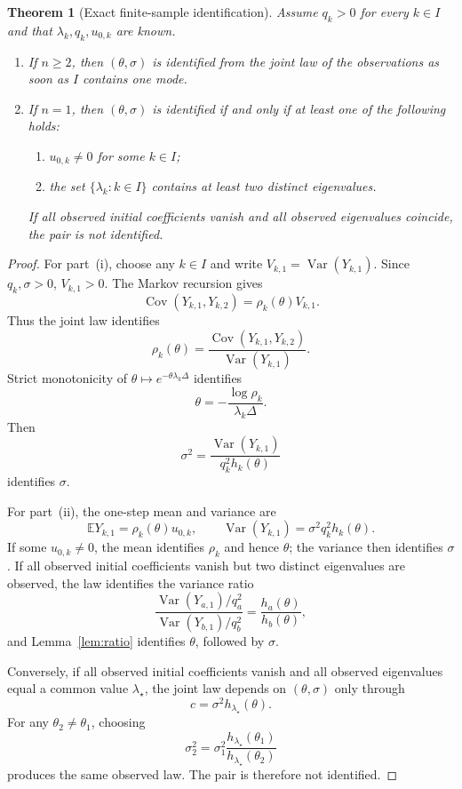 \documentclass[11pt]{article}
\newtheorem{theorem}[assumption]{Theorem}
\theoremstyle{remark}
\newcommand{\E}{\mathbb E}
\newcommand{\Cov}{\operatorname{Cov}}
\newcommand{\Var}{\operatorname{Var}}
\newcommand{\1}{\mathbf 1}
\begin{document}
\begin{theorem}[Exact finite-sample identification]\label{thm:exact-id}
Assume $q_k>0$ for every $k\in I$ and that $\lambda_k,q_k,u_{0,k}$ are known.

\begin{enumerate}[label=\textup{(\roman*)},leftmargin=2.6em]
\item If $n\ge2$, then $(\theta,\sigma)$ is identified from the joint law of the observations as soon as $I$ contains one mode.

\item If $n=1$, then $(\theta,\sigma)$ is identified if and only if at least one of the following holds:
\begin{enumerate}[label=\textup{(\alph*)},leftmargin=2.4em]
\item $u_{0,k}\ne0$ for some $k\in I$;
\item the set $\{\lambda_k:k\in I\}$ contains at least two distinct eigenvalues.
\end{enumerate}
If all observed initial coefficients vanish and all observed eigenvalues coincide, the pair is not identified.
\end{enumerate}
\end{theorem}

\begin{proof}
For part~(i), choose any $k\in I$ and write $V_{k,1}=\Var(Y_{k,1})$.  Since $q_k,\sigma>0$, $V_{k,1}>0$.  The Markov recursion gives
\[
 \Cov(Y_{k,1},Y_{k,2})=\rho_k(\theta)V_{k,1}.
\]
Thus the joint law identifies
\begin{equation}\label{eq:rho-from-cov}
 \rho_k(\theta)
 =\frac{\Cov(Y_{k,1},Y_{k,2})}
 {\Var(Y_{k,1})}.
\end{equation}
Strict monotonicity of $\theta\mapsto e^{-\theta\lambda_k\Delta}$ identifies
\[
 \theta=-\frac{\log\rho_k}{\lambda_k\Delta}.
\]
Then
\begin{equation}\label{eq:sigma-from-var}
 \sigma^2
 =\frac{\Var(Y_{k,1})}{q_k^2h_k(\theta)}
\end{equation}
identifies $\sigma$.

For part~(ii), the one-step mean and variance are
\[
 \E Y_{k,1}=\rho_k(\theta)u_{0,k},
 \qquad
 \Var(Y_{k,1})=\sigma^2q_k^2h_k(\theta).
\]
If some $u_{0,k}\ne0$, the mean identifies $\rho_k$ and hence $\theta$; the variance then identifies $\sigma$.  If all observed initial coefficients vanish but two distinct eigenvalues are observed, the law identifies the variance ratio
\[
 \frac{\Var(Y_{a,1})/q_a^2}
 {\Var(Y_{b,1})/q_b^2}
 =\frac{h_a(\theta)}{h_b(\theta)},
\]
and Lemma~\ref{lem:ratio} identifies $\theta$, followed by $\sigma$.

Conversely, if all observed initial coefficients vanish and all observed eigenvalues equal a common value $\lambda_\star$, the joint law depends on $(\theta,\sigma)$ only through
\[
 c=\sigma^2h_{\lambda_\star}(\theta).
\]
For any $\theta_2\ne\theta_1$, choosing
\[
 \sigma_2^2=\sigma_1^2
 \frac{h_{\lambda_\star}(\theta_1)}
 {h_{\lambda_\star}(\theta_2)}
\]
produces the same observed law.  The pair is therefore not identified.
\end{proof}
\end{document}
